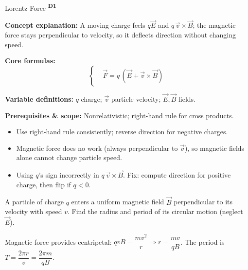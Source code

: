 ﻿\documentclass[12pt,a4paper]{article}
\providecommand{\KPFormulas}{}
\providecommand{\KPHeuristics}{}
\providecommand{\KPProblems}{}
\newcommand{\DOne}{\texorpdfstring{\textsuperscript{\textbf{D1}}}{ D1}}
\begin{document}
\begin{KnowledgePoint}{Lorentz Force \DOne}
  \KPFormulas
  \begin{formulabox}
  \textbf{Concept explanation:} A moving charge feels $q\vec E$ and $q\,\vec v\times\vec B$; the magnetic force stays perpendicular to velocity, so it deflects direction without changing speed.

  \textbf{Core formulas:}
  \[
  \left\{\begin{aligned}
    &\vec F=q\,(\vec E+\vec v\times\vec B)
  \end{aligned}\right.
  \]

  \textbf{Variable definitions:} $q$ charge; $\vec v$ particle velocity; $\vec E,\vec B$ fields.

\textbf{Prerequisites \& scope:} Nonrelativistic; right-hand rule for cross products.
  \end{formulabox}

  \KPHeuristics
  \begin{heuristicsbox}
  \begin{itemize}[leftmargin=*]
    \item Use right-hand rule consistently; reverse direction for negative charges.
    \item Magnetic force does no work (always perpendicular to $\vec v$), so magnetic fields alone cannot change particle speed.
  \end{itemize}
  \vspace{0.4em}
  \begin{itemize}[leftmargin=*]
    \item Using $q$'s sign incorrectly in $q\,\vec v\times\vec B$. Fix: compute direction for positive charge, then flip if $q<0$.
  \end{itemize}
  \end{heuristicsbox}

  \KPProblems
  \begin{cheatproblem}
  A particle of charge $q$ enters a uniform magnetic field $\vec B$ perpendicular to its velocity with speed $v$. Find the radius and period of its circular motion (neglect $\vec E$).
  \begin{solutionbox}
  Magnetic force provides centripetal: $qvB=\dfrac{mv^2}{r}\Rightarrow r=\dfrac{mv}{qB}$. The period is $T=\dfrac{2\pi r}{v}=\dfrac{2\pi m}{qB}$.
  \end{solutionbox}
  \end{cheatproblem}
\end{KnowledgePoint}
\end{document}

